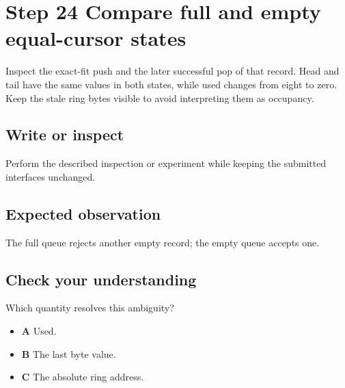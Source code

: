 \section{Step 24 Compare full and empty equal-cursor states}\label{ring-s24}

Inspect the exact-fit push and the later successful pop of that record. Head and tail have the same values in both states, while used changes from eight to zero. Keep the stale ring bytes visible to avoid interpreting them as occupancy.

\subsection{Write or inspect}
Perform the described inspection or experiment while keeping the submitted interfaces unchanged.

\subsection{Expected observation}
The full queue rejects another empty record; the empty queue accepts one.

\subsection{Check your understanding}
Which quantity resolves this ambiguity?

\begin{itemize}
  \item \textbf{A} Used.
  \item \textbf{B} The last byte value.
  \item \textbf{C} The absolute ring address.
\end{itemize}
